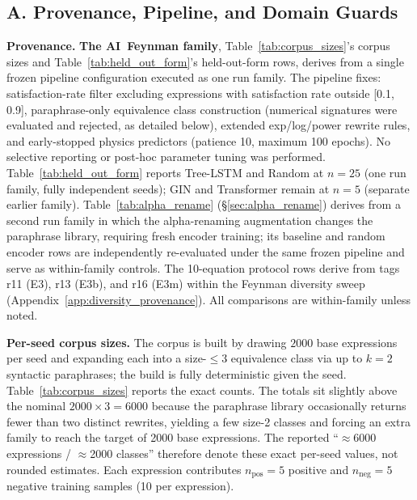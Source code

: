 \subsection*{A. Provenance, Pipeline, and Domain Guards}

\textbf{Provenance.} \textbf{The AI~Feynman family}, Table~\ref{tab:corpus_sizes}'s corpus sizes and Table~\ref{tab:held_out_form}'s held-out-form rows, derives from a single frozen pipeline configuration executed as one run family. The pipeline fixes: satisfaction-rate filter excluding expressions with satisfaction rate outside [0.1, 0.9], paraphrase-only equivalence class construction (numerical signatures were evaluated and rejected, as detailed below), extended exp/log/power rewrite rules, and early-stopped physics predictors (patience 10, maximum 100 epochs). No selective reporting or post-hoc parameter tuning was performed. Table~\ref{tab:held_out_form} reports Tree-LSTM and Random at $n{=}25$ (one run family, fully independent seeds); GIN and Transformer remain at $n{=}5$ (separate earlier family). Table~\ref{tab:alpha_rename} (§\ref{sec:alpha_rename}) derives from a second run family in which the alpha-renaming augmentation changes the paraphrase library, requiring fresh encoder training; its baseline and random encoder rows are independently re-evaluated under the same frozen pipeline and serve as within-family controls. The 10-equation protocol rows derive from tags r11 (E3), r13 (E3b), and r16 (E3m) within the Feynman diversity sweep (Appendix~\ref{app:diversity_provenance}). All comparisons are within-family unless noted.

\textbf{Per-seed corpus sizes.} The corpus is built by drawing $2000$ base expressions per seed and expanding each into a size-$\leq 3$ equivalence class via up to $k=2$ syntactic paraphrases; the build is fully deterministic given the seed. Table~\ref{tab:corpus_sizes} reports the exact counts. The totals sit slightly above the nominal $2000\times 3 = 6000$ because the paraphrase library occasionally returns fewer than two distinct rewrites, yielding a few size-2 classes and forcing an extra family to reach the target of 2000 base expressions. The reported ``$\approx$6000 expressions / $\approx$2000 classes'' therefore denote these exact per-seed values, not rounded estimates. Each expression contributes $n_{\text{pos}}{=}5$ positive and $n_{\text{neg}}{=}5$ negative training samples (10 per expression).

